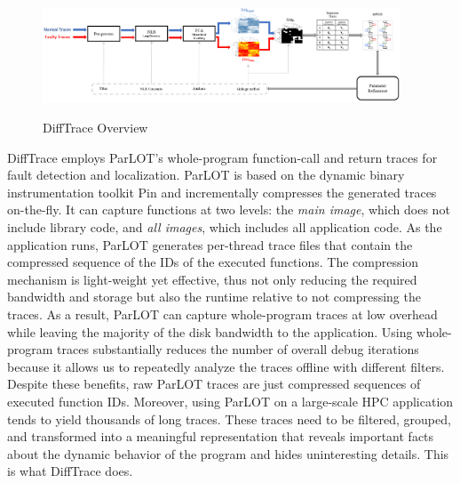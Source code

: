 ﻿\begin{figure}[]
\caption{DiffTrace Overview}
\includegraphics[width=0.95\textwidth]{figs/overview.png}
\label{fig.diffTraceOverview}
\end{figure}

DiffTrace employs ParLOT's \cite{parlot} whole-program function-call and return traces for fault detection and localization.
%
ParLOT is based on the dynamic binary instrumentation toolkit Pin \cite{pin} and incrementally compresses the generated traces on-the-fly.
%
It can capture functions at two levels: the \textit{main image}, which does not include library code, and \textit{all images}, which includes all application code.
%
As the application runs, ParLOT generates per-thread trace files that contain the compressed sequence of the IDs of the executed functions.
%
The compression mechanism is light-weight yet effective, thus not only reducing the required bandwidth and storage but also the runtime relative to not compressing the traces. As a result, ParLOT can capture whole-program traces at low overhead while leaving the majority of the disk bandwidth to the application. 
%
Using whole-program traces substantially reduces the number of overall debug iterations because it allows us to repeatedly analyze the traces offline with different filters.
%
Despite these benefits, raw ParLOT traces are just compressed sequences of executed function IDs.
%
Moreover, using ParLOT on a large-scale HPC application tends to yield thousands of long traces.
%
These traces need to be filtered, grouped, and transformed into a meaningful representation that reveals important facts about the dynamic behavior of the program and hides uninteresting details. This is what DiffTrace does.

